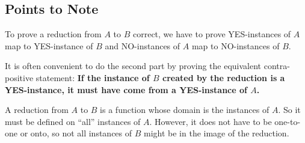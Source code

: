 \subsection{Points to Note}

To prove a reduction from $A$ to $B$ correct, we have to prove YES-instances of $A$ map to YES-instance of $B$ and NO-instances of $A$ map to NO-instances of $B$.

It is often convenient to do the second part by proving the equivalent contra-positive statement: \textbf{If the instance of $B$ created by the reduction is a YES-instance, it must have come from a YES-instance of $A$.}  
 
A reduction from $A$ to $B$ is a function whose domain is the instances of $A$. So it must be defined on ``all''  instances of $A$. However, it does not have to be one-to-one or onto, so not all instances of $B$ might be in the image of the reduction.
 
 
 
 
 
 
 
 
 
 
 
 
 
 
 
 
 
 
 
 